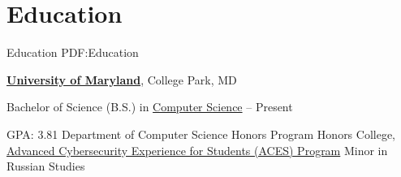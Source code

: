 
\section
{Education}
{Education}
{PDF:Education}

\href{https://umd.edu/}
{\textbf{University of Maryland}},
College Park, MD

\GapNoBreak
\BulletItem
Bachelor of Science (B.S.) in
\href{https://cs.umd.edu/}
{Computer Science}
\hfill
{} --
Present
\begin{detail}
\SubBulletItem
GPA: 3.81
\SubBulletItem
Department of Computer Science Honors Program
\SubBulletItem
Honors College, 
\href{https://aces.umd.edu/}
{Advanced Cybersecurity Experience for Students (ACES) Program}
\SubBulletItem
Minor in Russian Studies
\end{detail}